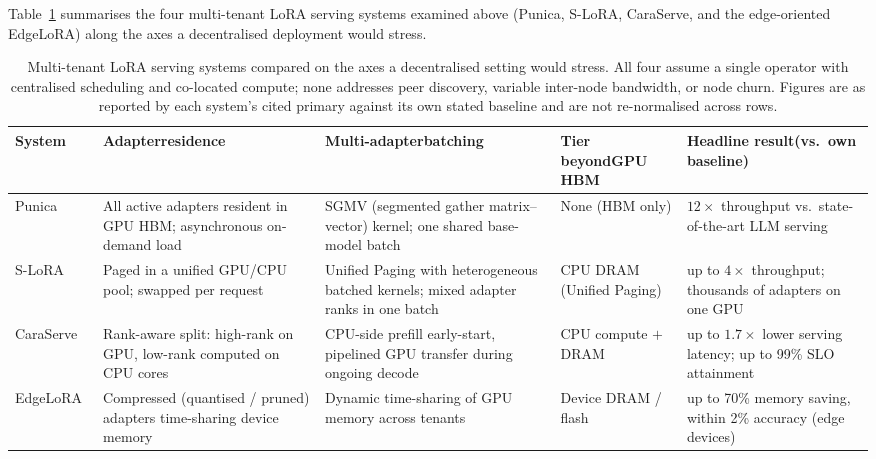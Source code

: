 Table~\ref{tab:serving_comparison} summarises the four multi-tenant LoRA serving
systems examined above (Punica, S-LoRA, CaraServe, and the edge-oriented
EdgeLoRA) along the axes a decentralised deployment would stress.

\begin{table}[H]
\centering
\caption{Multi-tenant LoRA serving systems compared on the axes a decentralised
setting would stress. All four assume a single operator with centralised
scheduling and co-located compute; none addresses peer discovery, variable
inter-node bandwidth, or node churn. Figures are as reported by each system's
cited primary against its own stated baseline and are not re-normalised across
rows.}
\label{tab:serving_comparison}
\small
\setlength{\tabcolsep}{4pt}
\begin{tabular}{l p{2.5cm} p{3.0cm} p{2.0cm} p{3.0cm}}
\toprule
\textbf{System} & \textbf{Adapter\newline residence} &
\textbf{Multi-adapter\newline batching} & \textbf{Tier beyond\newline GPU HBM} &
\textbf{Headline result\newline (vs.\ own baseline)} \\
\midrule
Punica~\cite{Chen2023Punica} & All active adapters resident in GPU HBM;
asynchronous on-demand load & SGMV (segmented gather matrix--vector) kernel;
one shared base-model batch & None (HBM only) & $12\times$ throughput vs.\
state-of-the-art LLM serving \\
S-LoRA~\cite{Sheng2024} & Paged in a unified GPU/CPU pool; swapped per request &
Unified Paging with heterogeneous batched kernels; mixed adapter ranks in one
batch & CPU DRAM (Unified Paging) & up to $4\times$ throughput; thousands of
adapters on one GPU \\
CaraServe~\cite{Li2024CaraServe} & Rank-aware split: high-rank on GPU, low-rank
computed on CPU cores & CPU-side prefill early-start, pipelined GPU transfer
during ongoing decode & CPU compute $+$ DRAM & up to $1.7\times$ lower serving
latency; up to 99\% SLO attainment \\
EdgeLoRA~\cite{Shen2025EdgeLoRA} & Compressed (quantised / pruned) adapters
time-sharing device memory & Dynamic time-sharing of GPU memory across tenants &
Device DRAM / flash & up to 70\% memory saving, within 2\% accuracy (edge
devices) \\
\bottomrule
\end{tabular}
\end{table}

